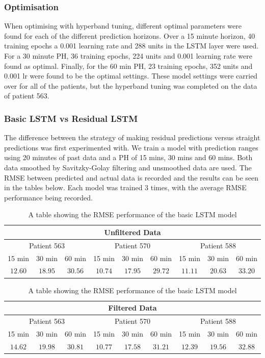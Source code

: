     \subsubsection{Optimisation}

      When optimising with hyperband tuning, different optimal parameters were found for each of the different prediction horizons. Over a 15 minute horizon, 40 training epochs a 0.001 learning rate and 288 units in the LSTM layer were used. For a 30 minute PH, 36 training epochs, 224 units and 0.001 learning rate were found as optimal. Finally, for the 60 min PH, 23 training epochs, 352 units and 0.001 lr were found to be the optimal settings. These model settings were carried over for all of the patients, but the hyperband tuning was completed on the data of patient 563.

    \subsubsection{Basic LSTM vs Residual LSTM}
      
      The difference between the strategy of making residual predictions versus straight predictions was first experimented with. We train a model with prediction ranges using 20 minutes of past data and a PH of 15 mins, 30 mins and 60 mins. Both data smoothed by Savitzky-Golay filtering and unsmoothed data are used. The RMSE between predicted and actual data is recorded and the results can be seen in the tables below. Each model was trained 3 times, with the average RMSE performance being recorded.

      \begin{table}[H]
        \centering
        \caption{A table showing the RMSE performance of the basic LSTM model}
        \begin{tabular}{|*{9}{c|}} 
          \hline
          \multicolumn{9}{|c|}{Unfiltered Data} \\ \hline
          \multicolumn{3}{|c}{Patient 563} & \multicolumn{3}{|c}{Patient 570} & \multicolumn{3}{|c|}{Patient 588} \\ \hline 
          15 min & 30 min & 60 min &15 min & 30 min & 60 min &15 min & 30 min & 60 min \\ \hline
          $12.60$&$18.95$ &$30.56$ &$10.74$ &$17.95$ &$29.72$ &$11.11$ &$20.63$ &$33.20$ \\ \hline
        \end{tabular}
        \begin{tabular}{|*{9}{c|}} 
          \hline
          \multicolumn{9}{|c|}{Filtered Data} \\ \hline
          \multicolumn{3}{|c}{Patient 563} & \multicolumn{3}{|c}{Patient 570} & \multicolumn{3}{|c|}{Patient 588} \\ \hline 
          15 min & 30 min & 60 min &15 min & 30 min & 60 min &15 min & 30 min & 60 min \\ \hline
          $14.62$ &$19.98$ &$30.81$ &$10.77$ &$17.58$ &$31.21$ &$12.39$ &$19.56$ &$32.88$ \\ \hline
        \end{tabular}
      \end{table}

